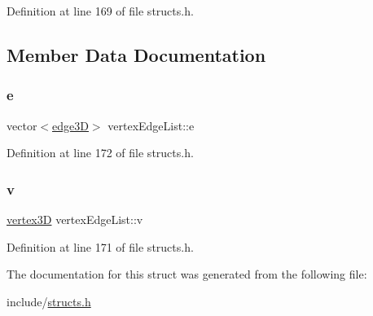 Definition at line 169 of file structs.\+h.



\subsection{Member Data Documentation}
\mbox{\label{structvertex_edge_list_a9de414e6a9e7df61810b5b2adbc2ac4d}} 
\subsubsection{\texorpdfstring{e}{e}}
{\footnotesize\ttfamily vector$<$\mbox{\hyperlink{structedge3_d}{edge3D}}$>$ vertex\+Edge\+List\+::e}



Definition at line 172 of file structs.\+h.

\mbox{\label{structvertex_edge_list_a28c924e4d346635bfaa382c499e7788d}} 
\subsubsection{\texorpdfstring{v}{v}}
{\footnotesize\ttfamily \mbox{\hyperlink{structvertex3_d}{vertex3D}} vertex\+Edge\+List\+::v}



Definition at line 171 of file structs.\+h.



The documentation for this struct was generated from the following file\+:\begin{DoxyCompactItemize}
\item 
include/\mbox{\hyperlink{structs_8h}{structs.\+h}}\end{DoxyCompactItemize}
